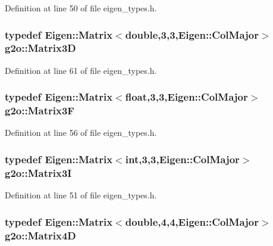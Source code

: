 Definition at line 50 of file eigen\+\_\+types.\+h.

\subsubsection[{\texorpdfstring{Matrix3D}{Matrix3D}}]{\setlength{\rightskip}{0pt plus 5cm}typedef Eigen\+::\+Matrix$<$double,3,3,Eigen\+::\+Col\+Major$>$ {\bf g2o\+::\+Matrix3D}}\hypertarget{namespaceg2o_ae968373755b3be75547f97573021dc8a}{}\label{namespaceg2o_ae968373755b3be75547f97573021dc8a}


Definition at line 61 of file eigen\+\_\+types.\+h.

\subsubsection[{\texorpdfstring{Matrix3F}{Matrix3F}}]{\setlength{\rightskip}{0pt plus 5cm}typedef Eigen\+::\+Matrix$<$float,3,3,Eigen\+::\+Col\+Major$>$ {\bf g2o\+::\+Matrix3F}}\hypertarget{namespaceg2o_aff36b18c387a854e64af640ad5cb0bd7}{}\label{namespaceg2o_aff36b18c387a854e64af640ad5cb0bd7}


Definition at line 56 of file eigen\+\_\+types.\+h.

\subsubsection[{\texorpdfstring{Matrix3I}{Matrix3I}}]{\setlength{\rightskip}{0pt plus 5cm}typedef Eigen\+::\+Matrix$<$int,3,3,Eigen\+::\+Col\+Major$>$ {\bf g2o\+::\+Matrix3I}}\hypertarget{namespaceg2o_ab8a98dad54fdc966987b61b750e03201}{}\label{namespaceg2o_ab8a98dad54fdc966987b61b750e03201}


Definition at line 51 of file eigen\+\_\+types.\+h.

\subsubsection[{\texorpdfstring{Matrix4D}{Matrix4D}}]{\setlength{\rightskip}{0pt plus 5cm}typedef Eigen\+::\+Matrix$<$double,4,4,Eigen\+::\+Col\+Major$>$ {\bf g2o\+::\+Matrix4D}}\hypertarget{namespaceg2o_aed3721c4efdc0f727e94569cc22ddd42}{}\label{namespaceg2o_aed3721c4efdc0f727e94569cc22ddd42}


